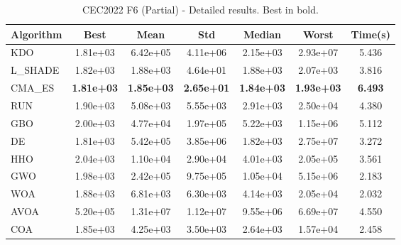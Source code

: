 \begin{table}[H]
\centering\small
\caption{CEC2022 F6 (Partial) - Detailed results. Best in bold.}
\label{tab:cec2022_F6}
\begin{tabular}{lcccccc}
\toprule
\textbf{Algorithm} & \textbf{Best} & \textbf{Mean} & \textbf{Std} & \textbf{Median} & \textbf{Worst} & \textbf{Time(s)} \\
\midrule
KDO & 1.81e+03 & 6.42e+05 & 4.11e+06 & 2.15e+03 & 2.93e+07 & 5.436 \\
L_SHADE & 1.82e+03 & 1.88e+03 & 4.64e+01 & 1.88e+03 & 2.07e+03 & 3.816 \\
CMA_ES & \textbf{1.81e+03} & \textbf{1.85e+03} & \textbf{2.65e+01} & \textbf{1.84e+03} & \textbf{1.93e+03} & \textbf{6.493} \\
RUN & 1.90e+03 & 5.08e+03 & 5.55e+03 & 2.91e+03 & 2.50e+04 & 4.380 \\
GBO & 2.00e+03 & 4.77e+04 & 1.97e+05 & 5.22e+03 & 1.15e+06 & 5.112 \\
DE & 1.81e+03 & 5.42e+05 & 3.85e+06 & 1.82e+03 & 2.75e+07 & 3.272 \\
HHO & 2.04e+03 & 1.10e+04 & 2.90e+04 & 4.01e+03 & 2.05e+05 & 3.561 \\
GWO & 1.98e+03 & 2.42e+05 & 9.75e+05 & 1.05e+04 & 5.15e+06 & 2.183 \\
WOA & 1.88e+03 & 6.81e+03 & 6.30e+03 & 4.14e+03 & 2.05e+04 & 2.032 \\
AVOA & 5.20e+05 & 1.31e+07 & 1.12e+07 & 9.55e+06 & 6.69e+07 & 4.550 \\
COA & 1.85e+03 & 4.25e+03 & 3.50e+03 & 2.64e+03 & 1.57e+04 & 2.458 \\
\bottomrule
\end{tabular}
\end{table}
